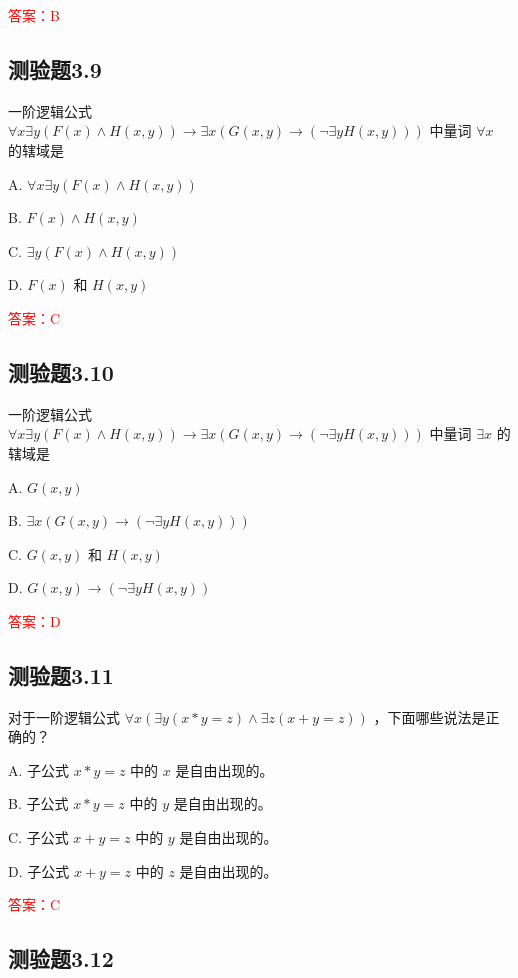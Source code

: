 \documentclass[UTF8, heading=true]{ctexart}
\begin{document}
\textcolor{red}{答案：B}

\subsection{测验题3.9}

一阶逻辑公式 $\forall x \exists y(F(x) \wedge H(x, y)) \rightarrow \exists x(G(x, y) \rightarrow(\neg \exists y H(x, y)))$ 中量词 $\forall x$ 的辖域是 $\qquad$

A. $\forall x \exists y(F(x) \wedge H(x, y))$

B. $F(x) \wedge H(x, y)$

C. $\exists y(F(x) \wedge H(x, y))$

D. $F(x)$ 和 $H(x, y)$

\textcolor{red}{答案：C}

\subsection{测验题3.10}

一阶逻辑公式 $\forall x \exists y(F(x) \wedge H(x, y)) \rightarrow \exists x(G(x, y) \rightarrow(\neg \exists y H(x, y)))$ 
中量词 $\exists x$ 的辖域是 $\qquad$

A. $G(x, y)$

B. $\exists x(G(x, y) \rightarrow(\neg \exists y H(x, y)))$

C. $G(x, y)$ 和 $H(x, y)$

D. $G(x, y) \rightarrow(\neg \exists y H(x, y))$

\textcolor{red}{答案：D}

\subsection{测验题3.11}

对于一阶逻辑公式 $\forall x(\exists y(x * y=z) \wedge \exists z(x+y=z))$ ，下面哪些说法是正确的？

A. 子公式 $x * y=z$ 中的 $x$ 是自由出现的。

B. 子公式 $x * y=z$ 中的 $y$ 是自由出现的。

C. 子公式 $x+y=z$ 中的 $y$ 是自由出现的。

D. 子公式 $x+y=z$ 中的 $z$ 是自由出现的。

\textcolor{red}{答案：C}

\subsection{测验题3.12}
\end{document}
